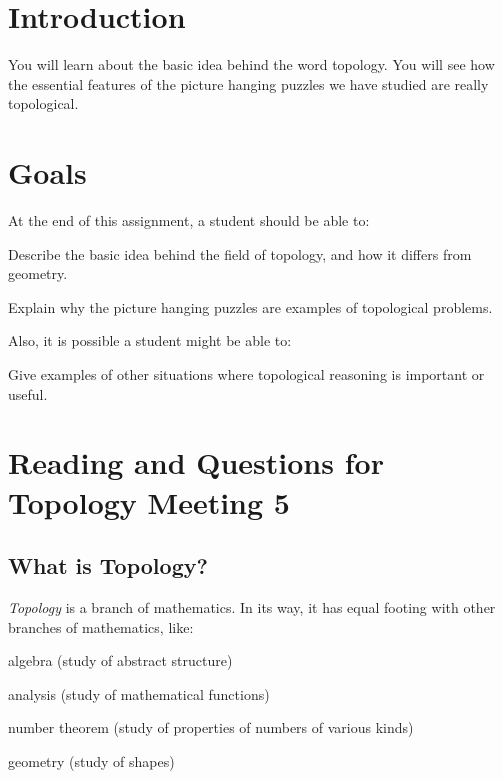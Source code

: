 \documentclass[12pt,letterpaper]{article}
\theoremstyle{definition}
\begin{document}
\setlength{\parskip}{1ex plus 0.5ex minus 0.2ex}
\setlength{\parindent}{0pt}

\pagestyle{fancy}
\cfoot{}

\section*{Introduction}
You will learn about the basic idea behind the word topology.
You will see how the essential features of the picture hanging puzzles we have studied are really topological.

\section*{Goals}
At the end of this assignment, a student should be able to:
\begin{compactitem}
\item Describe the basic idea behind the field of topology, and how it differs from geometry.
\item Explain why the picture hanging puzzles are examples of topological problems.
\end{compactitem}
Also, it is possible a student might be able to:
\begin{compactitem}
\item Give examples of other situations where topological reasoning is important or useful.
\end{compactitem}

\section*{Reading and Questions for Topology Meeting 5}

\subsection*{What is Topology?}


\emph{Topology} is a branch of mathematics. In its way, it has equal footing with other branches of mathematics, like:
\begin{compactitem}
\item algebra (study of abstract structure)
\item analysis (study of mathematical functions)
\item number theorem (study of properties of numbers of various kinds)
\item geometry (study of shapes)
\end{compactitem}
\end{document}
